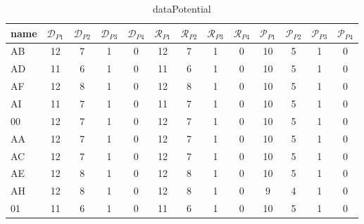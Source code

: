 \documentclass{article}
\begin{document}
\begin{table}[ht]
\centering
\begin{tabular}{|l|c|c|c|c|c|c|c|c|c|c|c|c|}
\hline
name & $\mathcal{D}_{P1}$ & $\mathcal{D}_{P2}$ & $\mathcal{D}_{P3}$ & $\mathcal{D}_{P4}$ & $\mathcal{R}_{P1}$ & $\mathcal{R}_{P2}$ & $\mathcal{R}_{P3}$ & $\mathcal{R}_{P4}$ & $\mathcal{P}_{P1}$& $\mathcal{P}_{P2}$ & $\mathcal{P}_{P3}$ & $\mathcal{P}_{P4}$\\ \hline
AB & 12 & 7 & 1 & 0 & 12 & 7 & 1 & 0 & 10 & 5 & 1 & 0 \\ \hline
AD & 11 & 6 & 1 & 0 & 11 & 6 & 1 & 0 & 10 & 5 & 1 & 0 \\ \hline
AF & 12 & 8 & 1 & 0 & 12 & 8 & 1 & 0 & 10 & 5 & 1 & 0 \\ \hline
AI & 11 & 7 & 1 & 0 & 11 & 7 & 1 & 0 & 10 & 5 & 1 & 0 \\ \hline
00 & 12 & 7 & 1 & 0 & 12 & 7 & 1 & 0 & 10 & 5 & 1 & 0 \\ \hline
AA & 12 & 7 & 1 & 0 & 12 & 7 & 1 & 0 & 10 & 5 & 1 & 0 \\ \hline
AC & 12 & 7 & 1 & 0 & 12 & 7 & 1 & 0 & 10 & 5 & 1 & 0 \\ \hline
AE & 12 & 8 & 1 & 0 & 12 & 8 & 1 & 0 & 10 & 5 & 1 & 0 \\ \hline
AH & 12 & 8 & 1 & 0 & 12 & 8 & 1 & 0 & 9 & 4 & 1 & 0 \\ \hline
01 & 11 & 6 & 1 & 0 & 11 & 6 & 1 & 0 & 10 & 5 & 1 & 0 \\ \hline
\end{tabular}
\caption{dataPotential}
\label{Tab:dataPotential}
\end{table}
\end{document}
